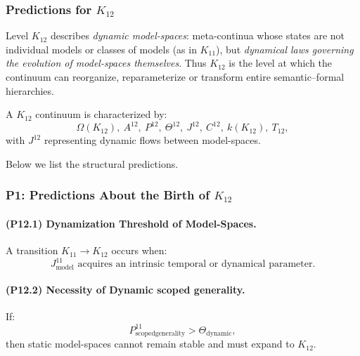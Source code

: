 

\subsubsection{Predictions for $K_{12}$}
\label{sec:predictions-k12}

Level $K_{12}$ describes \emph{dynamic model-spaces}: 
meta-continua whose states are not individual models 
or classes of models (as in $K_{11}$), 
but \emph{dynamical laws governing the evolution of model-spaces themselves}.  
Thus $K_{12}$ is the level at which the continuum 
can reorganize, reparameterize or transform 
entire semantic–formal hierarchies.

A $K_{12}$ continuum is characterized by:
\[
\Omega(K_{12}),\ 
A^{12},\ 
P^{12},\ 
\Theta^{12},\ 
J^{12},\ 
C^{12},\ 
k(K_{12}),\ 
T_{12},
\]
with $J^{12}$ representing dynamic flows between model-spaces.

Below we list the structural predictions.

\subsubsection{P1: Predictions About the Birth of $K_{12}$}

\paragraph{(P12.1) Dynamization Threshold of Model-Spaces.}
A transition $K_{11} \to K_{12}$ occurs when:
\[
J_{\mathrm{model}}^{11} 
\text{ acquires an intrinsic temporal or dynamical parameter}.
\]

\paragraph{(P12.2) Necessity of Dynamic scoped generality.}
If:
\[
P_{\mathrm{scoped generality}}^{11} > \Theta_{\mathrm{dynamic}},
\]
then static model-spaces cannot remain stable and must expand to $K_{12}$.

